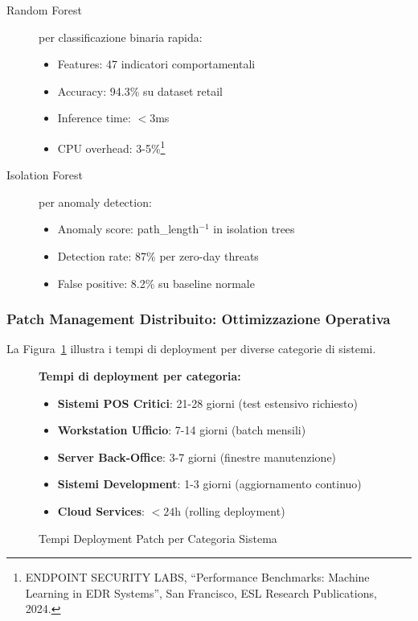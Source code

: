\begin{description}
    \item[Random Forest] per classificazione binaria rapida:
    \begin{itemize}
        \item Features: 47 indicatori comportamentali
        \item Accuracy: 94.3\% su dataset retail
        \item Inference time: $<3$ms
        \item CPU overhead: 3-5\%\footnote{ENDPOINT SECURITY LABS, ``Performance Benchmarks: Machine Learning in EDR Systems'', San Francisco, ESL Research Publications, 2024.}
    \end{itemize}
    
    \item[Isolation Forest] per anomaly detection:
    \begin{itemize}
        \item Anomaly score: path\_length$^{-1}$ in isolation trees
        \item Detection rate: 87\% per zero-day threats
        \item False positive: 8.2\% su baseline normale
    \end{itemize}
\end{description}

\subsubsection{Patch Management Distribuito: Ottimizzazione Operativa}

La Figura~\ref{fig:tempi-deployment-patch} illustra i tempi di deployment per diverse categorie di sistemi.

\begin{figure}[htbp]
\centering
\caption{Tempi Deployment Patch per Categoria Sistema}
\label{fig:tempi-deployment-patch}
\begin{minipage}{0.85\textwidth}
\footnotesize
\textbf{Tempi di deployment per categoria:}
\begin{itemize}
    \item \textbf{Sistemi POS Critici}: 21-28 giorni (test estensivo richiesto)
    \item \textbf{Workstation Ufficio}: 7-14 giorni (batch mensili)
    \item \textbf{Server Back-Office}: 3-7 giorni (finestre manutenzione)
    \item \textbf{Sistemi Development}: 1-3 giorni (aggiornamento continuo)
    \item \textbf{Cloud Services}: $<24$h (rolling deployment)
\end{itemize}
\end{minipage}
\end{figure}

